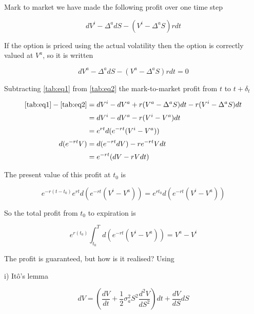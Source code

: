 \documentclass{article}
\newcommand{\para}{\vspace{8pt}} %
\begin{document}
Mark to market we have made the following profit over one time step

\begin{center}
\begin{equation}
    dV^i - \Delta^a dS -(V^i - \Delta^a S) rdt
    \label{tab:eq1}
\end{equation}
\end{center}
If the option is priced using the actual volatility then the option is correctly valued at $V^a$, so it is written
\begin{center}
\begin{equation}
    dV^a - \Delta^a dS -(V^a - \Delta^a S) rdt = 0 
    \label{tab:eq2}
\end{equation}
\end{center}
Subtracting \ref{tab:eq1} from \ref{tab:eq2} the mark-to-market profit from $t$ to $t + \delta_t$

\begin{center}
\begin{align*}
    \ref{tab:eq1} - \ref{tab:eq2} & = dV^i - dV^a + r(V^a - \Delta^a S) dt - r (V^i - \Delta^a S) dt \\[2pt]
                                  & = dV^i - dV^a - r(V^i - V^a) dt \\[2pt]
                                  & = e^{rt} d(e^{-rt} (V^i - V^a)) \\[2pt]
    d(e^{-rt}V)                   & = d(e^{-rt} dV) -r e^{-rt} V dt \\[2pt]
                                  & = e^{-rt} (dV -rV dt) \\
\end{align*}
\end{center}


The present value of this profit at $t_0$ is

\[
    e^{-r(t-t_0)} e^{rt} d(e^{-rt} (V^i - V^a)) = e^{rt_0} d(e^{-rt} (V^i - V^a))
\]

So the total profit from $t_0$ to expiration is

\begin{center}
\begin{equation}
    e^{r(t_0)} \int_{t_0}^{T} d(e^{-rt} (V^i - V^a)) = V^a - V^i
\end{equation}
\end{center}


The profit is guaranteed, but how is it realised? Using
\para

i) It\^{o}'s lemma 

\[
dV = (\frac{dV}{dt} + \frac{1}{2} \sigma_a^2 S^2 \frac{d^2V}{dS^2}) dt + \frac{dV}{dS} dS
\]
\end{document}

